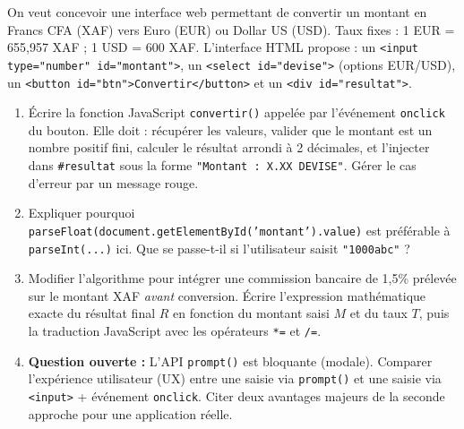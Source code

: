 \documentclass[11pt]{article}
\begin{document}
\begin{exercice}
On veut concevoir une interface web permettant de convertir un montant en Francs CFA (XAF) vers Euro (EUR) ou Dollar US (USD). Taux fixes : 1 EUR = 655,957 XAF ; 1 USD = 600 XAF. L'interface HTML propose : un \texttt{<input type="number" id="montant">}, un \texttt{<select id="devise">} (options EUR/USD), un \texttt{<button id="btn">Convertir</button>} et un \texttt{<div id="resultat">}.

\begin{enumerate}
    \item Écrire la fonction JavaScript \texttt{convertir()} appelée par l'événement \texttt{onclick} du bouton. Elle doit : récupérer les valeurs, valider que le montant est un nombre positif fini, calculer le résultat arrondi à 2 décimales, et l'injecter dans \texttt{\#resultat} sous la forme \texttt{"Montant : X.XX DEVISE"}. Gérer le cas d'erreur par un message rouge.
    \item Expliquer pourquoi \texttt{parseFloat(document.getElementById('montant').value)} est préférable à \texttt{parseInt(...)} ici. Que se passe-t-il si l'utilisateur saisit \texttt{"1000abc"} ?
    \item Modifier l'algorithme pour intégrer une commission bancaire de 1,5\% prélevée sur le montant XAF \textit{avant} conversion. Écrire l'expression mathématique exacte du résultat final $R$ en fonction du montant saisi $M$ et du taux $T$, puis la traduction JavaScript avec les opérateurs \texttt{*=} et \texttt{/=}.
    \item \textbf{Question ouverte :} L'API \texttt{prompt()} est bloquante (modale). Comparer l'expérience utilisateur (UX) entre une saisie via \texttt{prompt()} et une saisie via \texttt{<input>} + événement \texttt{onclick}. Citer deux avantages majeurs de la seconde approche pour une application réelle.
\end{enumerate}
\end{exercice}
\end{document}
